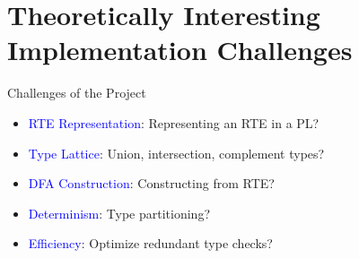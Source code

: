 \section{Theoretically Interesting Implementation Challenges}

{  %
\begin{frame}{Challenges of the Project}
  \begin{itemize}
  \item {} \textcolor{blue}{RTE Representation}:   Representing an RTE in a PL?
  \item {} \textcolor{blue}{Type Lattice}: Union, intersection, complement types?
  \item {} \textcolor{blue}{DFA Construction}:  Constructing from RTE?
  \item {} \textcolor{blue}{Determinism}: Type partitioning?
  \item {} \textcolor{blue}{Efficiency}: Optimize redundant type checks?
  \end{itemize}
\end{frame}
}


